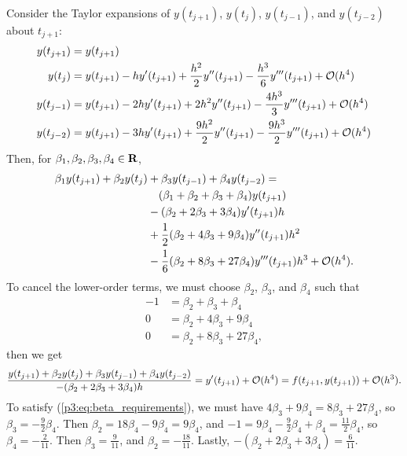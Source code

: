 \documentclass{homework}
\begin{document}
	\question
	Consider the Taylor expansions of $y(t_{j+1})$, $y(t_j)$, $y(t_{j-1})$, and $y(t_{j-2})$ about $t_{j+1}$:
	\begin{align}
		y(t_{j+1}) &= y(t_{j+1}) \\
		y(t_j) &= y(t_{j+1}) - hy'(t_{j+1}) + \frac{h^2}{2}y''(t_{j+1}) - \frac{h^3}{6}y'''(t_{j+1}) + \mathcal{O}(h^4) \\
		y(t_{j-1}) &= y(t_{j+1}) - 2hy'(t_{j+1}) + 2h^2y''(t_{j+1}) - \frac{4h^3}{3}y'''(t_{j+1}) + \mathcal{O}(h^4) \\
		y(t_{j-2}) &= y(t_{j+1}) - 3hy'(t_{j+1}) + \frac{9h^2}{2}y''(t_{j+1}) - \frac{9h^3}{2}y'''(t_{j+1}) + \mathcal{O}(h^4)
	\end{align}
	Then, for $\beta_1, \beta_2, \beta_3, \beta_4 \in \textbf{R}$,
	\begin{align}
		\beta_1 y(t_{j+1}) + \beta_2 y(t_j) &+ \beta_3 y(t_{j-1}) + \beta_4 y(t_{j-2}) = \\
		&\quad(\beta_1 + \beta_2+ \beta_3 + \beta_4)y(t_{j+1}) \\ &- (\beta_2 + 2\beta_3 + 3\beta_4)y'(t_{j+1})h \\ &+ \frac{1}{2}(\beta_2 + 4\beta_3 + 9\beta_4)y''(t_{j+1})h^2 \\ &- \frac{1}{6}(\beta_2 + 8\beta_3 + 27\beta_4)y'''(t_{j+1})h^3 + \mathcal{O}(h^4).
	\end{align}
	To cancel the lower-order terms, we must choose $\beta_2$, $\beta_3$, and $\beta_4$ such that
	\begin{equation}
		\label{p3:eq:beta_requirements}
		\begin{aligned}
			-1 &= \beta_2 + \beta_3 + \beta_4 \\
			0 &= \beta_2 + 4\beta_3 + 9\beta_4 \\
			0 &= \beta_2 + 8\beta_3 + 27\beta_4,
		\end{aligned}
	\end{equation}
	then we get
	\begin{equation}
		\label{p3:eq:three_step_bdf_est}
		\frac{y(t_{j+1}) + \beta_2y(t_j) + \beta_3y(t_{j-1}) + \beta_4y(t_{j-2})}{-(\beta_2 + 2\beta_3 + 3\beta_4)h} = y'(t_{j+1}) + \mathcal{O}(h^4) = f(t_{j+1}, y(t_{j+1})) + \mathcal{O}(h^3).
	\end{equation}
	To satisfy (\ref{p3:eq:beta_requirements}), we must have $4\beta_3 + 9\beta_4 = 8\beta_3 + 27\beta_4$, so $\beta_3 = -\frac{9}{2}\beta_4$. Then $\beta_2 = 18\beta_4 - 9\beta_4 = 9\beta_4$, and $-1 = 9\beta_4 - \frac{9}{2}\beta_4 + \beta_4 = \frac{11}{2}\beta_4$, so $\beta_4 = -\frac{2}{11}$. Then $\beta_3 = \frac{9}{11}$, and $\beta_2 = -\frac{18}{11}$. Lastly, $-(\beta_2 + 2\beta_3 + 3\beta_4) = \frac{6}{11}$.
	
\end{document}
